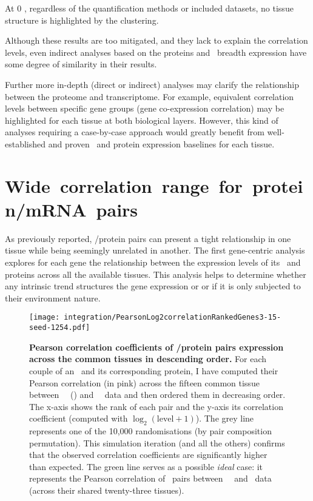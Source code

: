 At $0$ \FPKM, regardless of the quantification methods or included datasets,
no tissue structure is highlighted by the clustering.

Although these results are too mitigated, and
they lack to explain the correlation levels,
even indirect analyses based on the proteins and \mRNAs\ breadth expression
have some degree of similarity in their results.

Further more in-depth (direct or indirect)  analyses
may clarify the relationship between the proteome and transcriptome.
For example, equivalent correlation levels between specific gene groups
(gene co-expression correlation) may be highlighted
for each tissue at both biological layers.
However, this kind of analyses requiring a case-by-case approach
would greatly benefit from
well-established and proven \mRNA\ and protein expression baselines
for each tissue.


\section{Wide~correlation~range~for~protein/mRNA~pairs}
As previously reported, %
\mRNA/protein pairs can present
a tight relationship in one tissue
while being seemingly unrelated in another.
The first gene-centric analysis explores for each gene
the relationship between the expression levels of its \mRNAs\ and proteins
across all the available tissues.
This analysis helps to determine
whether any intrinsic trend structures the gene expression or
or if it is only subjected to their environment nature.

\begin{figure}[!htb]
    \texttt{[image: integration/PearsonLog2correlationRankedGenes3-15-seed-1254.pdf]}\centering
    \vspace{-2mm}
    \caption[Pearson correlation coefficients of \mRNA/protein pairs expression
    across the common tissues in descending order]
    {\label{fig:GeneProtCor}\textbf{Pearson correlation coefficients of \mRNA/protein
    pairs expression across the common tissues in descending order.}
    For each couple of an \mRNA\ and its corresponding protein,
    I have computed their Pearson correlation (in pink)
    across the fifteen common tissue
    between \pandey\ \etal\ (\PPKM) and \uhlen\ \etal\ data
    and then ordered them in decreasing order.
    The x-axis shows the rank of each pair
    and the y-axis its correlation coefficient
    (computed with $\log_2(\text{level}+1)$).
    The grey line represents one of the 10,000 randomisations
    (by pair composition permutation).
    This simulation iteration (and all the others) confirms
    that the observed correlation coefficients are
    significantly higher than expected.
    The green line serves as a possible \emph{ideal} case:
    it represents the Pearson correlation of \mRNAs\ pairs
    between \uhlen\ \etal\ and \gtex\ data
    (across their shared twenty-three tissues).
    }
    \vspace{-1em}
\end{figure}

